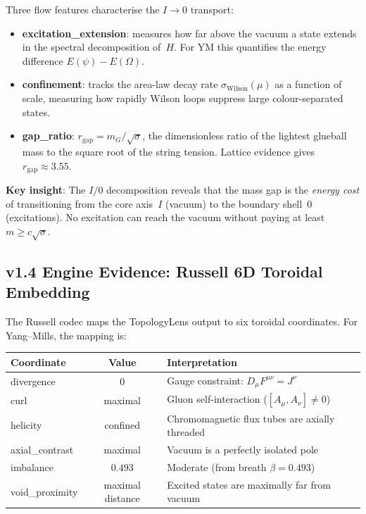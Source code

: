\documentclass[11pt]{article}
\begin{document}
\noindent
Three flow features characterise the $I \to 0$ transport:
\begin{itemize}
  \item \textbf{excitation\_extension}: measures how far above the vacuum
    a state extends in the spectral decomposition of~$H$.  For YM this
    quantifies the energy difference $E(\psi) - E(\Omega)$.
  \item \textbf{confinement}: tracks the area-law decay rate
    $\sigma_{\mathrm{Wilson}}(\mu)$ as a function of scale, measuring how
    rapidly Wilson loops suppress large colour-separated states.
  \item \textbf{gap\_ratio}: $r_{\mathrm{gap}} = m_G / \sqrt{\sigma}$,
    the dimensionless ratio of the lightest glueball mass to the square
    root of the string tension.  Lattice evidence gives $r_{\mathrm{gap}}
    \approx 3.55$.
\end{itemize}

\noindent
\textbf{Key insight}: The $I/0$ decomposition reveals that the mass gap
is the \emph{energy cost} of transitioning from the core axis~$I$
(vacuum) to the boundary shell~$0$ (excitations).  No excitation can
reach the vacuum without paying at least $m \geq c\sqrt{\sigma}$.

\subsection{v1.4 Engine Evidence: Russell 6D Toroidal Embedding}

The Russell codec maps the TopologyLens output to six toroidal
coordinates.  For Yang--Mills, the mapping is:

\begin{center}
\begin{tabular}{|l|c|l|}
\hline
\textbf{Coordinate} & \textbf{Value} & \textbf{Interpretation} \\
\hline
divergence & $0$ & Gauge constraint: $D_\mu F^{\mu\nu} = J^\nu$ \\
curl & maximal & Gluon self-interaction ($[A_\mu, A_\nu] \neq 0$) \\
helicity & confined & Chromomagnetic flux tubes are axially threaded \\
axial\_contrast & maximal & Vacuum is a perfectly isolated pole \\
imbalance & $0.493$ & Moderate (from breath $\beta = 0.493$) \\
void\_proximity & maximal distance & Excited states are maximally far from vacuum \\
\hline
\end{tabular}
\end{center}
\end{document}
